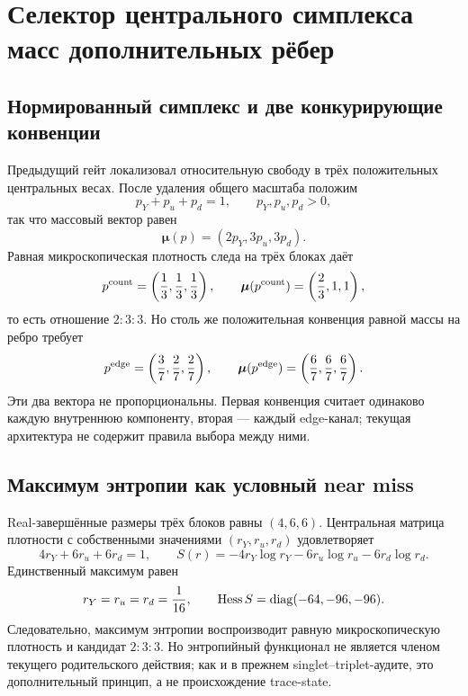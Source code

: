 \chapter{Селектор центрального симплекса масс дополнительных рёбер}
\label{ch:v8-baryon-c0-extra-edge-mass-central-trace-simplex-selector}

\section{Нормированный симплекс и две конкурирующие конвенции}

Предыдущий гейт локализовал относительную свободу в трёх положительных
центральных весах. После удаления общего масштаба положим
\begin{equation}
 p_Y+p_u+p_d=1,\qquad p_Y,p_u,p_d>0,
 \label{eq:v8-extra-edge-simplex-normalization}
\end{equation}
так что массовый вектор равен
\begin{equation}
 \boldsymbol\mu(p)=(2p_Y,3p_u,3p_d).
 \label{eq:v8-extra-edge-simplex-mass-map}
\end{equation}
Равная микроскопическая плотность следа на трёх блоках даёт
\begin{equation}
 p^{\rm count}=\left(\frac13,\frac13,\frac13\right),\qquad
 \boldsymbol\mu(p^{\rm count})=\left(\frac23,1,1\right),
 \label{eq:v8-extra-edge-simplex-counting-candidate}
\end{equation}
то есть отношение $2:3:3$. Но столь же положительная конвенция равной массы
на ребро требует
\begin{equation}
 p^{\rm edge}=\left(\frac37,\frac27,\frac27\right),\qquad
 \boldsymbol\mu(p^{\rm edge})=\left(\frac67,\frac67,\frac67\right).
 \label{eq:v8-extra-edge-simplex-equal-edge-candidate}
\end{equation}
Эти два вектора не пропорциональны. Первая конвенция считает одинаково
каждую внутреннюю компоненту, вторая --- каждый edge-канал; текущая
архитектура не содержит правила выбора между ними.

\section{Максимум энтропии как условный near miss}

Real-завершённые размеры трёх блоков равны $(4,6,6)$. Центральная матрица
плотности с собственными значениями $(r_Y,r_u,r_d)$ удовлетворяет
\begin{equation}
 4r_Y+6r_u+6r_d=1,
 \qquad
 S(r)=-4r_Y\log r_Y-6r_u\log r_u-6r_d\log r_d.
 \label{eq:v8-extra-edge-simplex-entropy}
\end{equation}
Единственный максимум равен
\begin{equation}
 r_Y=r_u=r_d=\frac1{16},\qquad
 \operatorname{Hess} S=\operatorname{diag}(-64,-96,-96).
 \label{eq:v8-extra-edge-simplex-entropy-maximum}
\end{equation}
Следовательно, максимум энтропии воспроизводит равную микроскопическую
плотность и кандидат $2:3:3$. Но энтропийный функционал не является членом
текущего родительского действия; как и в прежнем singlet--triplet-аудите,
это дополнительный принцип, а не происхождение trace-state.

